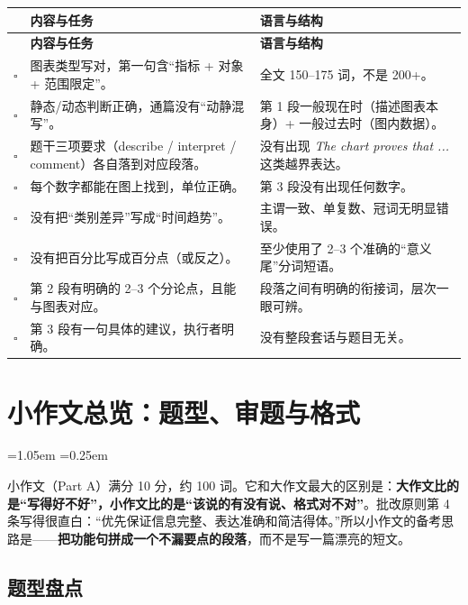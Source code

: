 \documentclass[11pt,a4paper]{ctexart}
\newcommand{\en}[1]{\textit{#1}}
\newenvironment{note}{%
  \par\addvspace{5pt}%
  \begin{list}{}{\leftmargin=1.05em \rightmargin=0.25em \listparindent=0pt
    \itemindent=0pt \topsep=0pt \parsep=2pt \itemsep=2pt \partopsep=0pt}%
  \item\relax\small\color{ink}%
}{%
  \end{list}\addvspace{5pt}%
}
\newcommand{\cb}{$\square$}
\begin{document}
\begin{longtable}{C{0.8cm} L{6.4cm} L{6.4cm}}
\toprule
& \textbf{内容与任务} & \textbf{语言与结构}\\
\midrule
\endfirsthead
\toprule
& \textbf{内容与任务} & \textbf{语言与结构}\\
\midrule
\endhead
\cb & 图表类型写对，第一句含“指标 + 对象 + 范围限定”。 & 全文 150--175 词，不是 200+。\\
\cb & 静态/动态判断正确，通篇没有“动静混写”。 & 第 1 段一般现在时（描述图表本身）+ 一般过去时（图内数据）。\\
\cb & 题干三项要求（describe / interpret / comment）各自落到对应段落。 & 没有出现 \en{The chart proves that ...} 这类越界表达。\\
\cb & 每个数字都能在图上找到，单位正确。 & 第 3 段没有出现任何数字。\\
\cb & 没有把“类别差异”写成“时间趋势”。 & 主谓一致、单复数、冠词无明显错误。\\
\cb & 没有把百分比写成百分点（或反之）。 & 至少使用了 2--3 个准确的“意义尾”分词短语。\\
\cb & 第 2 段有明确的 2--3 个分论点，且能与图表对应。 & 段落之间有明确的衔接词，层次一眼可辨。\\
\cb & 第 3 段有一句具体的建议，执行者明确。 & 没有整段套话与题目无关。\\
\bottomrule
\end{longtable}

\clearpage

\section{小作文总览：题型、审题与格式}

\begin{note}
小作文（Part A）满分 10 分，约 100 词。它和大作文最大的区别是：\textbf{大作文比的是“写得好不好”，小作文比的是“该说的有没有说、格式对不对”}。批改原则第 4 条写得很直白：“优先保证信息完整、表达准确和简洁得体。”所以小作文的备考思路是——\textbf{把功能句拼成一个不漏要点的段落}，而不是写一篇漂亮的短文。
\end{note}

\subsection{题型盘点}
\end{document}
